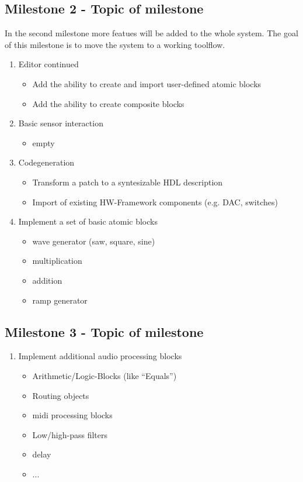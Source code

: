 \subsection{Milestone 2 - Topic of milestone}

In the second milestone more featues will be added to the whole system. The goal of this milestone is to move the system to a working toolflow.

	\begin{enumerate}
		\item Editor continued
			\begin{itemize}
				\item Add the ability to create and import user-defined atomic blocks
				\item Add the ability to create composite blocks
			\end{itemize}
		\item Basic sensor interaction
			\begin{itemize}
			\item empty
			\end{itemize}
		\item Codegeneration	
			\begin{itemize}
				\item Transform a patch to a syntesizable HDL description
				\item Import of existing HW-Framework components (e.g. DAC, switches)
			\end{itemize}
		\item Implement a set of basic atomic blocks
			\begin{itemize}
				\item wave generator (saw, square, sine)
				\item multiplication
				\item addition
				\item ramp generator
			\end{itemize}
	\end{enumerate}

\subsection{Milestone 3 - Topic of milestone}
	
	\begin{enumerate}
		\item Implement additional audio processing blocks
		\begin{itemize}
			\item Arithmetic/Logic-Blocks (like "`Equals"')
			\item Routing objects
			\item midi processing blocks
			\item Low/high-pass filters
			\item delay
			\item ...
		\end{itemize}
	\end{enumerate}
	
